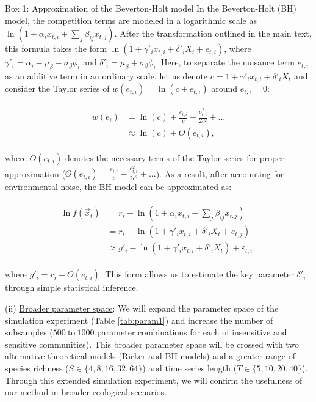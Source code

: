 \documentclass[12pt, class=article, crop=false]{standalone}
\begin{document}
\begin{tcolorbox}[{
  breakable,
  colback=white,
  colframe=gray,
  coltext=black,
  parbox=false,
  boxsep=5pt,
  arc=1pt}]
    Box 1: Approximation of the Beverton-Holt model
    \hline
    In the Beverton-Holt (BH) model, the competition terms are modeled in a logarithmic scale as $\ln(1 + \alpha_i x_{t,i} + \sum_j \beta_{ij} x_{t,j})$.
    After the transformation outlined in the main text, this formula takes the form $\ln(1 + \gamma'_i x_{t,i} + \delta'_i X_t + e_{t,i})$, where $\gamma'_i = \alpha_i - \mu_{\beta} - \sigma_{\beta} \phi_i$ and $\delta'_i = \mu_{\beta} + \sigma_{\beta} \phi_i$.
    Here, to separate the nuisance term $e_{t,i}$ as an additive term in an ordinary scale, let us denote $c = 1 + \gamma'_i x_{t,i} + \delta'_i X_t$ and consider the Taylor series of $w(e_{t,i}) = \ln(c + e_{t,i})$ around $e_{t,i} = 0$:

    \begin{align}
        \begin{split}
        \label{eq:bhtaylor}
        w(e_i) &= \ln(c) + \frac{e_{t,i}}{c} - \frac{e_{t,i}^2}{2 c^2} + ...\\
        &\approx \ln(c) + O(e_{t,i}),
        \end{split}
    \end{align}

    where $O(e_{t,i})$ denotes the necessary terms of the Taylor series for proper approximation ($O(e_{t,i}) = \frac{e_{t,i}}{c} - \frac{e_{t,i}^2}{2 c^2} + ...$). 
    As a result, after accounting for environmental noise, the BH model can be approximated as:

    \begin{align}
    \begin{split}
        \ln f(\overset{\rightarrow}{x}_{t}) 
            &= r_i - \ln(1 + \alpha_i x_{t,i} + \sum_j \beta_{ij} x_{t,j})\\
            &= r_i - \ln(1 + \gamma'_i x_{t,i} + \delta'_{i} X_t + e_{t,j})\\
            &\approx g'_{i} - \ln(1 + \gamma'_i x_{t,i} + \delta'_i X_t) + \varepsilon_{t,i},
    \end{split}
    \end{align}

    where $g'_{i} = r_i + \overline{O(e_{t,i})}$.
    This form allows us to estimate the key parameter $\delta'_i$ through simple statistical inference.
\end{tcolorbox}

(ii) \ul{Broader parameter space}: We will expand the parameter space of the simulation experiment (Table \ref{tab:param1}) and increase the number of subsamples ($500~\mbox{to}~1000$ parameter combinations for each of insensitive and sensitive communities).
This broader parameter space will be crossed with two alternative theoretical models (Ricker and BH models) and a greater range of species richness ($S \in \{4, 8, 16, 32, 64\}$) and time series length ($T \in \{5, 10, 20, 40\}$).
Through this extended simulation experiment, we will confirm the usefulness of our method in broader ecological scenarios.
\end{document}
